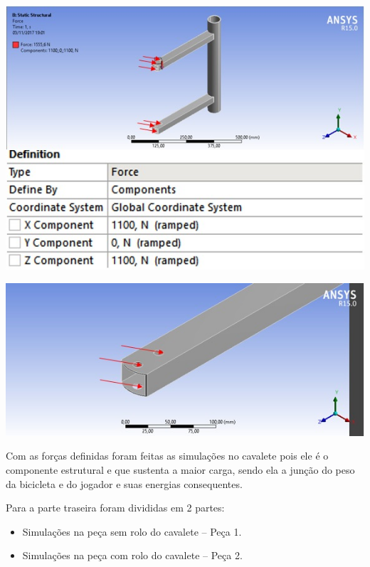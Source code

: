     \begin{center}
    	\includegraphics[scale=0.7]{figuras/forcas_1}
        \label{forcas_1}
    \end{center}   
     
    
    \begin{center}
    	\includegraphics[scale=0.7]{figuras/forcas_2}
        \label{forcas_2}
    \end{center}  
 
    Com as forças definidas foram feitas as simulações no cavalete pois ele é o componente estrutural e que sustenta a maior carga, sendo ela a junção do peso da bicicleta e do jogador e suas energias consequentes.
 
    Para a parte traseira foram divididas em 2 partes:
    \begin{itemize}
        \item Simulações na peça sem rolo do cavalete – Peça 1.
        \item Simulações na peça com rolo do cavalete – Peça 2.
    \end{itemize}
 
